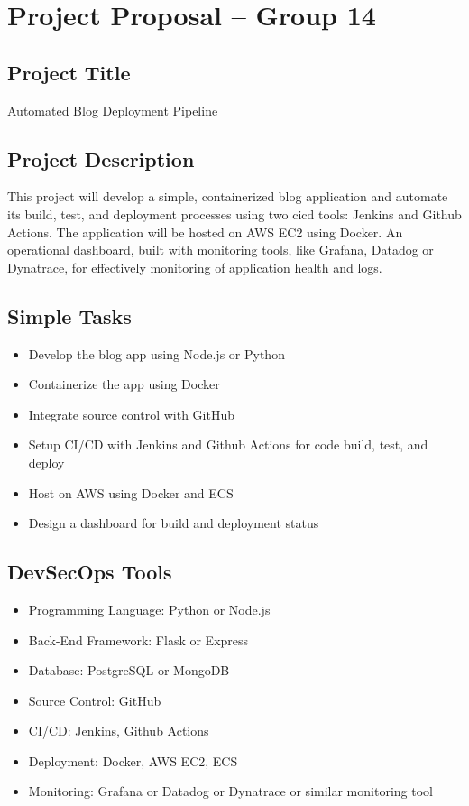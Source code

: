 \chapter{Project Proposal -- Group 14}
\label{chap:proposal}

\section{Project Title}
Automated Blog Deployment Pipeline

\section{Project Description}
This project will develop a simple, containerized blog application and automate its build, test, and deployment processes using two \gls{cicd} tools: Jenkins and Github Actions. The application will be hosted on AWS EC2 using Docker. An operational dashboard, built with monitoring tools, like Grafana, Datadog or Dynatrace, for effectively monitoring of application health and logs.

\section{Simple Tasks}
\begin{itemize}
\item Develop the blog app using Node.js or Python
\item Containerize the app using Docker
\item Integrate source control with GitHub
\item Setup CI/CD with Jenkins and Github Actions for code build, test, and deploy
\item Host on AWS using Docker and ECS
\item Design a dashboard for build and deployment status
\end{itemize}

\section{DevSecOps Tools}
\begin{itemize}
\item Programming Language: Python or Node.js
\item Back-End Framework: Flask or Express
\item Database: PostgreSQL or MongoDB
\item Source Control: GitHub
\item CI/CD: Jenkins, Github Actions
\item Deployment: Docker, AWS EC2, ECS
\item Monitoring: Grafana or Datadog or Dynatrace or similar monitoring tool
\end{itemize}
